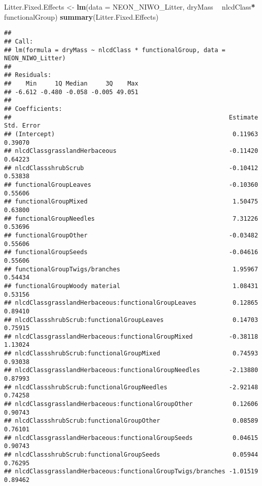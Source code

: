 \documentclass[]{article}
\newenvironment{Shaded}{\begin{snugshade}}{\end{snugshade}}
\newcommand{\DataTypeTok}[1]{\textcolor[rgb]{0.13,0.29,0.53}{#1}}
\newcommand{\KeywordTok}[1]{\textcolor[rgb]{0.13,0.29,0.53}{\textbf{#1}}}
\newcommand{\NormalTok}[1]{#1}
\newcommand{\OperatorTok}[1]{\textcolor[rgb]{0.81,0.36,0.00}{\textbf{#1}}}
\newcommand{\StringTok}[1]{\textcolor[rgb]{0.31,0.60,0.02}{#1}}
\begin{document}
\begin{Shaded}
\begin{Highlighting}[]
\NormalTok{Litter.Fixed.Effects <-}\StringTok{ }\KeywordTok{lm}\NormalTok{(}\DataTypeTok{data =}\NormalTok{ NEON_NIWO_Litter, dryMass }\OperatorTok{~}\StringTok{ }\NormalTok{nlcdClass}\OperatorTok{*}
\StringTok{                            }\NormalTok{functionalGroup) }
\KeywordTok{summary}\NormalTok{(Litter.Fixed.Effects)}
\end{Highlighting}
\end{Shaded}

\begin{verbatim}
## 
## Call:
## lm(formula = dryMass ~ nlcdClass * functionalGroup, data = NEON_NIWO_Litter)
## 
## Residuals:
##    Min     1Q Median     3Q    Max 
## -6.612 -0.480 -0.058 -0.005 49.051 
## 
## Coefficients:
##                                                            Estimate Std. Error
## (Intercept)                                                 0.11963    0.39070
## nlcdClassgrasslandHerbaceous                               -0.11420    0.64223
## nlcdClassshrubScrub                                        -0.10412    0.53838
## functionalGroupLeaves                                      -0.10360    0.55606
## functionalGroupMixed                                        1.50475    0.63800
## functionalGroupNeedles                                      7.31226    0.53696
## functionalGroupOther                                       -0.03482    0.55606
## functionalGroupSeeds                                       -0.04616    0.55606
## functionalGroupTwigs/branches                               1.95967    0.54434
## functionalGroupWoody material                               1.08431    0.53156
## nlcdClassgrasslandHerbaceous:functionalGroupLeaves          0.12865    0.89410
## nlcdClassshrubScrub:functionalGroupLeaves                   0.14703    0.75915
## nlcdClassgrasslandHerbaceous:functionalGroupMixed          -0.38118    1.13024
## nlcdClassshrubScrub:functionalGroupMixed                    0.74593    0.93038
## nlcdClassgrasslandHerbaceous:functionalGroupNeedles        -2.13880    0.87993
## nlcdClassshrubScrub:functionalGroupNeedles                 -2.92148    0.74258
## nlcdClassgrasslandHerbaceous:functionalGroupOther           0.12606    0.90743
## nlcdClassshrubScrub:functionalGroupOther                    0.08589    0.76101
## nlcdClassgrasslandHerbaceous:functionalGroupSeeds           0.04615    0.90743
## nlcdClassshrubScrub:functionalGroupSeeds                    0.05944    0.76295
## nlcdClassgrasslandHerbaceous:functionalGroupTwigs/branches -1.01519    0.89462

\end{verbatim}
\end{document}
